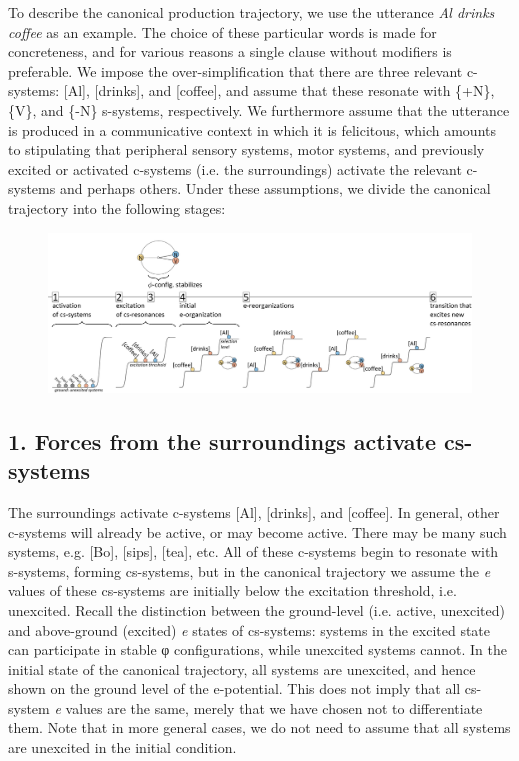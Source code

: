 To describe the canonical production trajectory, we use the utterance \textit{Al drinks coffee} as an example. The choice of these particular words is made for concreteness, and for various reasons a single clause without modifiers is preferable. We impose the over-simplification that there are three relevant c-systems: [Al], [drinks], and [coffee], and assume that these resonate with \{+N\}, \{V\}, and \{-N\} s-systems, respectively. We furthermore assume that the utterance is produced in a communicative context in which it is felicitous, which amounts to stipulating that peripheral sensory systems, motor systems, and previously excited or activated c-systems (i.e. the surroundings) activate the relevant c-systems and perhaps others. Under these assumptions, we divide the canonical trajectory into the following stages:

  
\begin{figure}
\includegraphics[width=\textwidth]{figures/Tilsen-img51.png}
\caption{\missingcaption}
\label{fig:}
\end{figure}
 

\subsection{{1. Forces from the surroundings activate cs-systems}} 

The surroundings activate c-systems [Al], [drinks], and [coffee]. In general, other c-systems will already be active, or may become active. There may be many such systems, e.g. [Bo], [sips], [tea], etc. All of these c-systems begin to resonate with s-systems, forming cs-systems, but in the canonical trajectory we assume the \textit{e} values of these cs-systems are initially below the excitation threshold, i.e. unexcited. Recall the distinction between the ground-level (i.e. active, unexcited) and above-ground (excited) \textit{e} states of cs-systems: systems in the excited state can participate in stable φ configurations, while unexcited systems cannot. In the initial state of the canonical trajectory, all systems are unexcited, and hence shown on the ground level of the e-potential. This does not imply that all cs-system \textit{e} values are the same, merely that we have chosen not to differentiate them. Note that in more general cases, we do not need to assume that all systems are unexcited in the initial condition.

